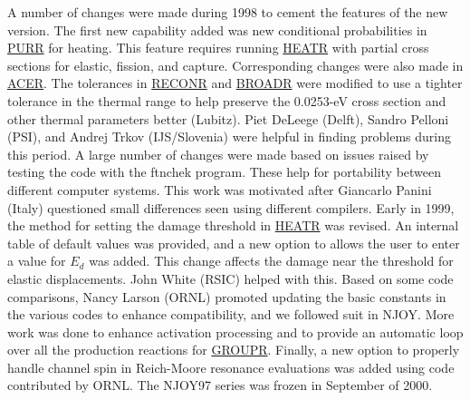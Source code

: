 A number of changes were made during 1998 to cement the features
of the new version.  The first new capability added was new
conditional probabilities in \hyperlink{sPURRhy}{PURR}
for heating.  This feature requires running \hyperlink{sHEATRhy}{HEATR}
 with partial cross sections for
elastic, fission, and capture.  Corresponding changes were also
made in \hyperlink{sACERhy}{ACER}.  The tolerances in
\hyperlink{sRECONRhy}{RECONR}
and \hyperlink{sBROADRhy}{BROADR} were
modified to use a tighter tolerance in the thermal range to help
preserve the 0.0253-eV cross section and other thermal parameters
better (Lubitz).  Piet DeLeege (Delft),
Sandro Pelloni (PSI), and Andrej Trkov
(IJS/Slovenia) were helpful in finding problems during this
period.  A large number of changes were made based on
issues raised by testing the code with the ftnchek program.  These
help for portability between different computer systems.  This
work was motivated after Giancarlo Panini (Italy)
questioned small differences seen using different compilers.  Early
in 1999, the method for setting the damage threshold in
\hyperlink{sHEATRhy}{HEATR} was
revised.  An internal table of default values was provided, and
a new option to allows the user to enter a value for $E_d$ was added.
This change affects the damage near the threshold for elastic
displacements.  John White (RSIC) helped with this.
Based on some code comparisons, Nancy Larson (ORNL)
promoted updating the basic constants in the various codes to
enhance compatibility, and we followed suit in NJOY.  More work
was done to enhance activation processing and to provide an
automatic loop over all the production reactions for
\hyperlink{sGROUPRhy}{GROUPR}.  Finally,
a new option to properly handle
channel spin in Reich-Moore resonance evaluations was added using
code contributed by ORNL.  The NJOY97 series was
frozen in September of 2000.


